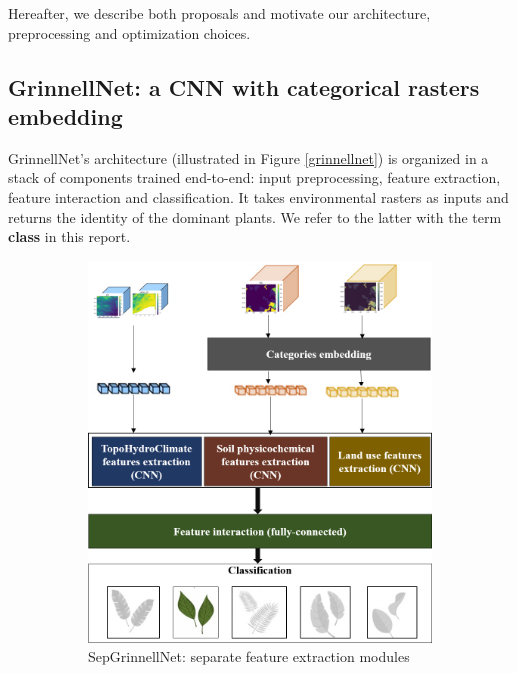 \documentclass[]{article}
\begin{document}
\noindent Hereafter, we describe both proposals and motivate our architecture, preprocessing and optimization choices.

\subsection{GrinnellNet: a CNN with categorical rasters embedding}
GrinnellNet's architecture (illustrated in Figure \ref{grinnellnet}) is organized in a stack of components trained end-to-end: input preprocessing, feature extraction, feature interaction and classification. It takes environmental rasters as inputs and returns the identity of the dominant plants. We refer to the latter with the term \textbf{class} in this report.

\begin{figure}
	\begin{subfigure}{0.5\textwidth}
		\includegraphics[scale=0.4]{grinnellsep.png}
		\caption{SepGrinnellNet: separate feature extraction modules} \label{grinnellnet:a}
	\end{subfigure}
	\hspace*{\fill} %
	\begin{subfigure}{0.5\textwidth}

\end{subfigure}
\end{figure}
\end{document}
